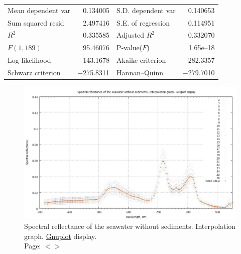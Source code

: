 \documentclass[11pt]{article}
\begin{document}
\begin{appendices}
\begin{table}[H]
\begin{center}
	\vspace{2em}
	\begin{tabular}{lrlr}
		Mean dependent var &  0.134005 & S.D. dependent var &  0.140653 \\
		Sum squared resid &  2.497416 & S.E. of regression &  0.114951 \\
		$R^2$ &  0.335585 & Adjusted $R^2$ &  0.332070 \\
		$F(1, 189)$ &  95.46076 & P-value($F$) &  1.65\textrm{e--18} \\
		Log-likelihood &  143.1678 & Akaike criterion & $-$282.3357 \\
		Schwarz criterion & $-$275.8311 & Hannan--Quinn & $-$279.7010 \\
	\end{tabular}
	\label{tab:15}
	\end{center}
\end{table}
\pagebreak

\begin{figure}[H]
	\begin{center}
		\includegraphics[scale=0.22]{GNU-10.jpg}
		\caption{Spectral reflectance of the seawater without sediments. Interpolation graph. \href{http://www.gnuplot.info/}{Gnuplot} display. \\
Page: $<$\pageref{page-31}$>$­}
		\label{fig:A.24}
	\end{center}
\end{figure}


\end{appendices}
\end{document}
